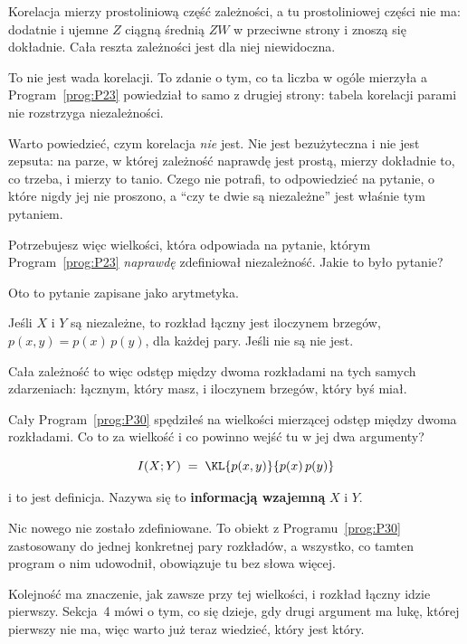\begin{fr}

Korelacja mierzy prostoliniową część zależności, a tu prostoliniowej części
nie ma: dodatnie i ujemne $Z$ ciągną średnią $ZW$ w przeciwne strony i
znoszą się dokładnie. Cała reszta zależności jest dla niej niewidoczna.

To nie jest wada korelacji. To zdanie o tym, co ta liczba w ogóle mierzyła
\dash{} a Program~\ref{prog:P23} powiedział to samo z drugiej strony: tabela
korelacji parami nie rozstrzyga niezależności.

Warto powiedzieć, czym korelacja \emph{nie} jest. Nie jest bezużyteczna i nie
jest zepsuta: na parze, w której zależność naprawdę jest prostą, mierzy
dokładnie to, co trzeba, i mierzy to tanio. Czego nie potrafi, to odpowiedzieć
na pytanie, o które nigdy jej nie proszono, a \enquote{czy te dwie są
niezależne} jest właśnie tym pytaniem.

Potrzebujesz więc wielkości, która odpowiada na pytanie, którym
Program~\ref{prog:P23} \emph{naprawdę} zdefiniował niezależność. Jakie to
było pytanie?
\dotline
\nextframe
\end{fr}

\begin{fr}

Oto to pytanie zapisane jako arytmetyka.

Jeśli $X$ i $Y$ są niezależne, to rozkład łączny jest iloczynem brzegów,
$p(x, y) = p(x)\,p(y)$, dla każdej pary. Jeśli nie są \dash{} nie jest.

Cała zależność to więc odstęp między dwoma rozkładami na tych samych
zdarzeniach: łącznym, który masz, i iloczynem brzegów, który byś miał.

Cały Program~\ref{prog:P30} spędziłeś na wielkości mierzącej odstęp między
dwoma rozkładami. Co to za wielkość i co powinno wejść tu w jej dwa
argumenty?
\dotline
\nextframe
\end{fr}

\begin{fr}

\[ I(X; Y) \;=\; \KL{p(x, y)}{p(x)\,p(y)} \]

i to jest definicja. Nazywa się to \textbf{informacją wzajemną} $X$ i $Y$.

Nic nowego nie zostało zdefiniowane. To obiekt z
Programu~\ref{prog:P30} zastosowany do jednej konkretnej pary rozkładów, a
wszystko, co tamten program o nim udowodnił, obowiązuje tu bez słowa więcej.

\begin{note}
Kolejność ma znaczenie, jak zawsze przy tej wielkości, i rozkład łączny idzie
pierwszy. Sekcja~4 mówi o tym, co się dzieje, gdy drugi argument ma lukę,
której pierwszy nie ma, więc warto już teraz wiedzieć, który jest który.
\end{note}
\end{fr}

